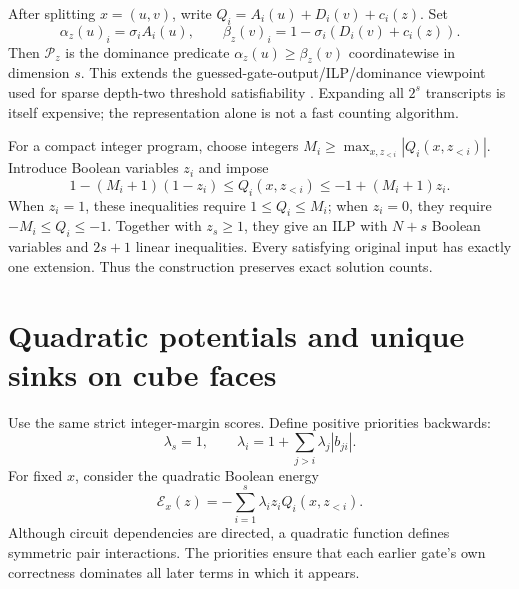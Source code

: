 \documentclass[11pt]{article}
\theoremstyle{definition}
\begin{document}
After splitting \(x=(u,v)\), write \(Q_i=A_i(u)+D_i(v)+c_i(z)\). Set
\[
 \alpha_z(u)_i=\sigma_i A_i(u),\qquad
 \beta_z(v)_i=1-\sigma_i(D_i(v)+c_i(z)).
\]
Then \(\mathcal P_z\) is the dominance predicate
\(\alpha_z(u)\ge\beta_z(v)\) coordinatewise in dimension \(s\).
This extends the guessed-gate-output/ILP/dominance viewpoint used for sparse depth-two threshold satisfiability \cite{IPS13}. Expanding all \(2^s\) transcripts is itself expensive; the representation alone is not a fast counting algorithm.

For a compact integer program, choose integers
\(M_i\ge\max_{x,z_{<i}}|Q_i(x,z_{<i})|\). Introduce Boolean variables \(z_i\) and impose
\[
 1-(M_i+1)(1-z_i)\le Q_i(x,z_{<i})
 \le -1+(M_i+1)z_i.                                    \tag{25}
\]
When \(z_i=1\), these inequalities require \(1\le Q_i\le M_i\); when \(z_i=0\), they require \(-M_i\le Q_i\le-1\). Together with \(z_s\ge1\), they give an ILP with \(N+s\) Boolean variables and \(2s+1\) linear inequalities. Every satisfying original input has exactly one extension. Thus the construction preserves exact solution counts.

\section{Quadratic potentials and unique sinks on cube faces}\label{sec:potential}
Use the same strict integer-margin scores. Define positive priorities backwards:
\[
 \lambda_s=1,\qquad
 \lambda_i=1+\sum_{j>i}\lambda_j|b_{ji}|.
\]
For fixed \(x\), consider the quadratic Boolean energy
\[
 \mathcal E_x(z)=-\sum_{i=1}^s\lambda_i z_iQ_i(x,z_{<i}). \tag{26}
\]
Although circuit dependencies are directed, a quadratic function defines symmetric pair interactions. The priorities ensure that each earlier gate's own correctness dominates all later terms in which it appears.
\end{document}
